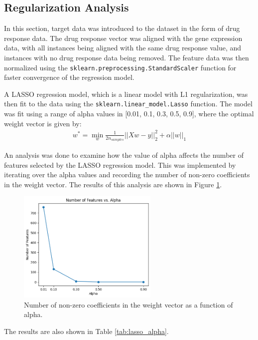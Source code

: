 \documentclass[12pt]{article}
\begin{document}
\subsection{Regularization Analysis}
In this section, target data was introduced to the dataset in the form of drug response data. The drug response vector was aligned with the gene expression data, with all instances being aligned with the same drug response value, and instances with no drug response data being removed. The feature data was then normalized using the \verb|sklearn.preprocessing.StandardScaler| function for faster convergence of the regression model.

A LASSO regression model, which is a linear model with L1 regularization, was then fit to the data using the \verb|sklearn.linear_model.Lasso| function. The model was fit using a range of alpha values in [0.01, 0.1, 0.3, 0.5, 0.9], where the optimal weight vector is given by:
\begin{align*}
    w^* = \min_w \frac{1}{2n_{samples}}||Xw-y||_2^2 + \alpha||w||_1
\end{align*}

An analysis was done to examine how the value of alpha affects the number of features selected by the LASSO regression model. This was implemented by iterating over the alpha values and recording the number of non-zero coefficients in the weight vector. The results of this analysis are shown in Figure \ref{fig:lasso_alpha}.

\begin{figure}[H]
    \centering
    \includegraphics[width=0.6\textwidth]{Images/regularization.png}
    \caption{Number of non-zero coefficients in the weight vector as a function of alpha.}
    \label{fig:lasso_alpha}
\end{figure}

The results are also shown in Table \ref{tab:lasso_alpha}.
\end{document}
